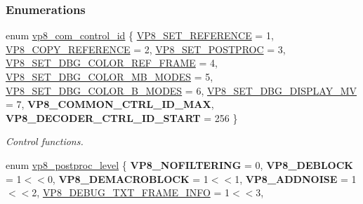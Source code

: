 \subsubsection*{\-Enumerations}
\begin{DoxyCompactItemize}
\item 
enum \hyperlink{group__vp8_ga8cadbc8e0af3da96ef7a2dbd4ed06599}{vp8\-\_\-com\-\_\-control\-\_\-id} \{ \*
\hyperlink{group__vp8_gga8cadbc8e0af3da96ef7a2dbd4ed06599a7abc38d739a5ef49c36d9b2cd88e64a6}{\-V\-P8\-\_\-\-S\-E\-T\-\_\-\-R\-E\-F\-E\-R\-E\-N\-C\-E} =  1, 
\hyperlink{group__vp8_gga8cadbc8e0af3da96ef7a2dbd4ed06599a5375b3ea3a4867d50daee6f5971c7470}{\-V\-P8\-\_\-\-C\-O\-P\-Y\-\_\-\-R\-E\-F\-E\-R\-E\-N\-C\-E} =  2, 
\hyperlink{group__vp8_gga8cadbc8e0af3da96ef7a2dbd4ed06599a43e85c68bc1c1473f4a94b005a59482c}{\-V\-P8\-\_\-\-S\-E\-T\-\_\-\-P\-O\-S\-T\-P\-R\-O\-C} =  3, 
\hyperlink{group__vp8_gga8cadbc8e0af3da96ef7a2dbd4ed06599ab52ea7a97668b603812dfc205b0fd783}{\-V\-P8\-\_\-\-S\-E\-T\-\_\-\-D\-B\-G\-\_\-\-C\-O\-L\-O\-R\-\_\-\-R\-E\-F\-\_\-\-F\-R\-A\-M\-E} =  4, 
\*
\hyperlink{group__vp8_gga8cadbc8e0af3da96ef7a2dbd4ed06599aa0d5c3eaa7cbecaf64403edc8450b060}{\-V\-P8\-\_\-\-S\-E\-T\-\_\-\-D\-B\-G\-\_\-\-C\-O\-L\-O\-R\-\_\-\-M\-B\-\_\-\-M\-O\-D\-E\-S} =  5, 
\hyperlink{group__vp8_gga8cadbc8e0af3da96ef7a2dbd4ed06599ae0052b9dd3c64a4bb822abafb4755a87}{\-V\-P8\-\_\-\-S\-E\-T\-\_\-\-D\-B\-G\-\_\-\-C\-O\-L\-O\-R\-\_\-\-B\-\_\-\-M\-O\-D\-E\-S} =  6, 
\hyperlink{group__vp8_gga8cadbc8e0af3da96ef7a2dbd4ed06599abc6aef0d7e0486d25348de217ad8441d}{\-V\-P8\-\_\-\-S\-E\-T\-\_\-\-D\-B\-G\-\_\-\-D\-I\-S\-P\-L\-A\-Y\-\_\-\-M\-V} =  7, 
{\bfseries \-V\-P8\-\_\-\-C\-O\-M\-M\-O\-N\-\_\-\-C\-T\-R\-L\-\_\-\-I\-D\-\_\-\-M\-A\-X}, 
\*
{\bfseries \-V\-P8\-\_\-\-D\-E\-C\-O\-D\-E\-R\-\_\-\-C\-T\-R\-L\-\_\-\-I\-D\-\_\-\-S\-T\-A\-R\-T} =  256
 \}
\begin{DoxyCompactList}\small\item\em \-Control functions. \end{DoxyCompactList}\item 
enum \hyperlink{group__vp8_ga99557e20eb37826e6792cd8819121770}{vp8\-\_\-postproc\-\_\-level} \{ \*
{\bfseries \-V\-P8\-\_\-\-N\-O\-F\-I\-L\-T\-E\-R\-I\-N\-G} =  0, 
{\bfseries \-V\-P8\-\_\-\-D\-E\-B\-L\-O\-C\-K} =  1$<$$<$0, 
{\bfseries \-V\-P8\-\_\-\-D\-E\-M\-A\-C\-R\-O\-B\-L\-O\-C\-K} =  1$<$$<$1, 
{\bfseries \-V\-P8\-\_\-\-A\-D\-D\-N\-O\-I\-S\-E} =  1$<$$<$2, 
\*
\hyperlink{group__vp8_gga99557e20eb37826e6792cd8819121770ab52568f51e409f219744e06b446102bb}{\-V\-P8\-\_\-\-D\-E\-B\-U\-G\-\_\-\-T\-X\-T\-\_\-\-F\-R\-A\-M\-E\-\_\-\-I\-N\-F\-O} =  1$<$$<$3, 

\end{DoxyCompactItemize}
